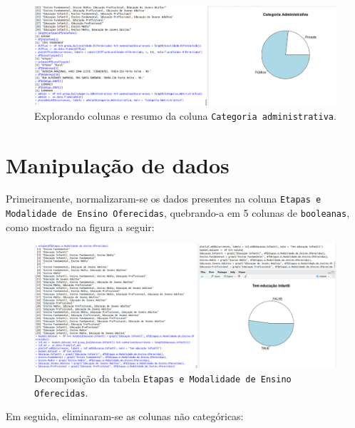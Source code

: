 \documentclass{article}[twocolumn]
\begin{document}
	\begin{figure}[H]
		\centering
		\includegraphics[width=\textwidth]{figures/exploration4.png}
		\caption{Explorando colunas e resumo da coluna \texttt{Categoria administrativa}.}
	\end{figure}
	\section{Manipula\c{c}\~ao de dados}
	Primeiramente, normalizaram-se os dados presentes na coluna \texttt{Etapas e Modalidade de
	Ensino Oferecidas}, quebrando-a em 5 colunas de \texttt{booleanas}, como mostrado na figura
	a seguir:
	\begin{figure}[H]
		\centering
		\includegraphics[width=\textwidth]{figures/manipulation1.png}
		\caption{Decomposi\c{c}\~ao da tabela \texttt{Etapas e Modalidade de Ensino Oferecidas}.}
	\end{figure}
	Em seguida, eliminaram-se as colunas n\~ao categ\'oricas:
\end{document}
